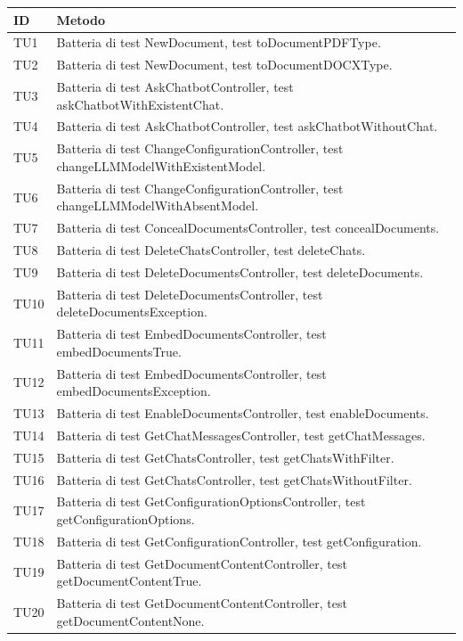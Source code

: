 \documentclass[10pt, a4paper]{article}
\begin{document}
\begin{xltabular}{\textwidth}{p{0.12\textwidth}|X}
\textbf{ID} & \textbf{Metodo} \\
\hline
TU1 & Batteria di test NewDocument, test toDocumentPDFType. \\
\hline
TU2 & Batteria di test NewDocument, test toDocumentDOCXType. \\
\hline
TU3 & Batteria di test AskChatbotController, test askChatbotWithExistentChat. \\
\hline
TU4 & Batteria di test AskChatbotController, test askChatbotWithoutChat. \\
\hline
TU5 & Batteria di test ChangeConfigurationController, test changeLLMModelWithExistentModel. \\
\hline
TU6 & Batteria di test ChangeConfigurationController, test changeLLMModelWithAbsentModel. \\
\hline
TU7 & Batteria di test ConcealDocumentsController, test concealDocuments. \\
\hline
TU8 & Batteria di test DeleteChatsController, test deleteChats. \\
\hline
TU9 & Batteria di test DeleteDocumentsController, test deleteDocuments. \\
\hline
TU10 & Batteria di test DeleteDocumentsController, test deleteDocumentsException. \\
\hline
TU11 & Batteria di test EmbedDocumentsController, test embedDocumentsTrue. \\
\hline
TU12 & Batteria di test EmbedDocumentsController, test embedDocumentsException. \\
\hline
TU13 & Batteria di test EnableDocumentsController, test enableDocuments. \\
\hline
TU14 & Batteria di test GetChatMessagesController, test getChatMessages. \\
\hline
TU15 & Batteria di test GetChatsController, test getChatsWithFilter. \\
\hline
TU16 & Batteria di test GetChatsController, test getChatsWithoutFilter. \\
\hline
TU17 & Batteria di test GetConfigurationOptionsController, test getConfigurationOptions. \\
\hline
TU18 & Batteria di test GetConfigurationController, test getConfiguration. \\
\hline
TU19 & Batteria di test GetDocumentContentController, test getDocumentContentTrue. \\
\hline
TU20 & Batteria di test GetDocumentContentController, test getDocumentContentNone. \\

\end{xltabular}
\end{document}
